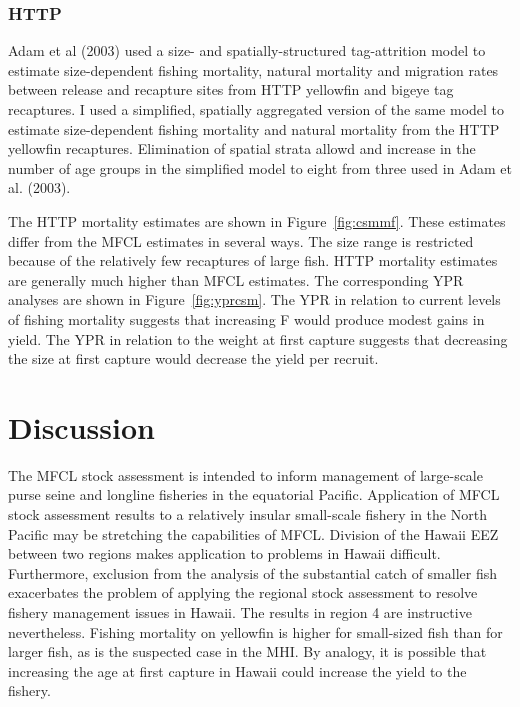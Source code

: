 \documentclass[12pt,letterpaper,twoside]{article}
\begin{document}
\subsubsection*{HTTP}
Adam et al (2003) used a size- and spatially-structured
tag-attrition model to estimate
size-dependent fishing mortality, natural
mortality and migration rates between release and recapture sites from
HTTP yellowfin and bigeye tag recaptures. 
I used a simplified, spatially aggregated version of the same
model to estimate size-dependent fishing
mortality and natural mortality from the HTTP yellowfin recaptures.
Elimination of spatial strata allowd and increase in
the number of age groups in the simplified model
to eight from three used in Adam et al. (2003).

The HTTP mortality estimates are shown in Figure~\ref{fig:csmmf}.
These estimates differ from the MFCL estimates in several ways. The
size range is restricted because of the relatively few
recaptures of large fish. HTTP mortality estimates
are generally much higher than MFCL estimates.
The corresponding YPR analyses are shown in Figure~\ref{fig:yprcsm}.
The YPR in relation to current levels of fishing mortality suggests
that increasing F would produce modest gains in yield.
The YPR in relation to the weight at first capture suggests that
decreasing the size at first capture would decrease the
yield per recruit.


\section*{Discussion}
The MFCL stock assessment is intended to inform management of
large-scale purse seine and longline fisheries in the equatorial Pacific.
Application of MFCL stock assessment results to a relatively insular
small-scale fishery in the North Pacific may be stretching the
capabilities of MFCL. Division of the Hawaii EEZ between two regions
makes application to problems in Hawaii difficult. Furthermore,
exclusion from the analysis of the substantial catch of smaller fish exacerbates
the problem of applying the regional stock assessment to
resolve fishery management issues in Hawaii. The results in region 4
are instructive nevertheless.
Fishing mortality on yellowfin is higher for small-sized fish than for
larger fish, as is the suspected case in the MHI. By analogy, it is
possible that increasing the age at first capture in Hawaii could increase
the yield to the fishery. 
\end{document}
